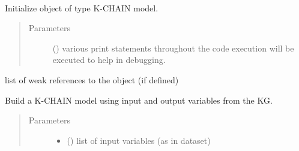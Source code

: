 \documentclass[letterpaper,10pt,english]{sphinxmanual}
\begin{document}
\begin{fulllineitems}
\label{\detokenize{index:kChain.kChainModel}}~

\begin{fulllineitems}
\label{\detokenize{index:kChain.kChainModel.__init__}}
Initialize object of type K-CHAIN model.
\begin{quote}\begin{description}
\item[{Parameters}] \leavevmode
{} () \textendash{} various print statements throughout the code
execution will be executed to help in debugging.

\end{description}\end{quote}

\end{fulllineitems}


\begin{fulllineitems}
\label{\detokenize{index:kChain.kChainModel.__weakref__}}
list of weak references to the object (if defined)

\end{fulllineitems}


\begin{fulllineitems}
\label{\detokenize{index:kChain.kChainModel.build}}
Build a K-CHAIN model using input and output variables from the KG.
\begin{quote}\begin{description}
\item[{Parameters}] \leavevmode\begin{itemize}
\item {} 
 () \textendash{} list of input variables (as in dataset)


\end{itemize}
\end{description}
\end{quote}
\end{fulllineitems}
\end{fulllineitems}
\end{document}
